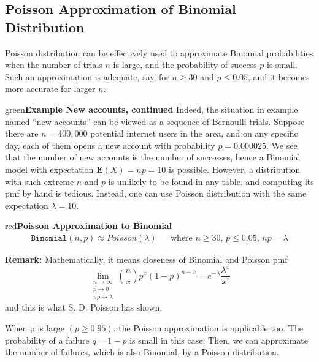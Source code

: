 \documentclass{article}
\newenvironment{example}[1]{\begin{mybox}{green}{\textbf{Example #1}}}{\end{mybox}}
\newenvironment{formula}[1]{\begin{mybox}{red}{\textbf{#1}}}{\end{mybox}}
\begin{document}
\newpage
\subsection{Poisson Approximation of Binomial Distribution}

Poisson distribution can be effectively used to approximate Binomial probabilities when the number of trials $n$ is large, and the probability of success $p$ is small. Such an approximation is adequate, say, for $n \geq 30$ and $p \leq 0.05$, and it becomes more accurate for larger $n$.
\begin{example}{New accounts, continued}
Indeed, the situation in example named ``new accounts'' can be viewed as a sequence of Bernoulli trials. Suppose there are $n = 400,000$ potential internet users in the area, and on any specific day, each of them opens a new account with probability $p = 0.000025$. We see that the number of new accounts is the number of successes, hence a Binomial model with expectation $\mathbf{E}(X) = np = 10$ is possible. However, a distribution with such extreme $n$ and $p$ is unlikely to be found in any table, and computing its pmf by hand is tedious. Instead, one can use Poisson distribution with the same expectation $\lambda = 10$.
\end{example}

\setcounter{equation}{13}
\begin{formula}{Poisson Approximation to Binomial}
\begin{align}
    \texttt{Binomial}(n, p) \approx Poisson(\lambda)& &\text{where $n \geq 30$, $p \leq 0.05$, $np = \lambda$}
\end{align}
\end{formula}
\textbf{Remark:} Mathematically, it means closeness of Binomial and Poisson pmf
\begin{equation*}
    \lim_{\substack{n \to \infty \\ p\to0 \\ np\to\lambda}} \binom{n}{x} p^x (1-p)^{n-x} = e^{- \lambda} \frac{\lambda^x}{x!}
\end{equation*}
and this is what S. D. Poisson has shown.

When p is large $(p \geq 0.95)$, the Poisson approximation is applicable too. The probability of a failure $q = 1 - p$ is small in this case. Then, we can approximate the number of failures, which is also Binomial, by a Poisson distribution.
\end{document}
